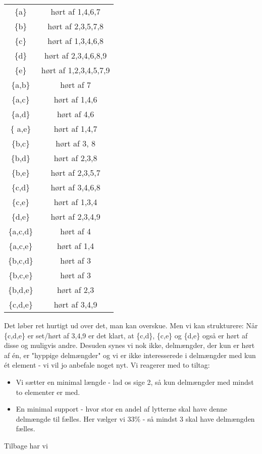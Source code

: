 \documentclass[a4paper, 12pt]{article}
\theoremstyle{remark}
\begin{document}
\begin{center}
\begin{tabular}{cc}


\{a\} & hørt af 1,4,6,7 \\
\{b\} & hørt af 2,3,5,7,8 \\
\{c\}& hørt af 1,3,4,6,8\\
\{d\} & hørt af 2,3,4,6,8,9 \\
\{e\} & hørt af 1,2,3,4,5,7,9 \\
\{a,b\} & hørt af 7 \\
\{a,c\} & hørt af 1,4,6 \\
\{a,d\}& hørt af 4,6\\
\{ a,e\}& hørt af 1,4,7\\
\{b,c\} & hørt af 3, 8 \\
\{b,d\}& hørt af 2,3,8 \\
\{b,e\}& hørt af  2,3,5,7\\
\{c,d\}& hørt af 3,4,6,8\\
\{c,e\}& hørt af 1,3,4\\
\{d,e\}& hørt af 2,3,4,9\\
\{a,c,d\}& hørt af 4\\
\{a,c,e\}& hørt af 1,4 \\
\{b,c,d\}& hørt af 3\\
\{b,c,e\}& hørt af 3\\
\{b,d,e\}& hørt af 2,3 \\
\{c,d,e\} & hørt af 3,4,9 \\

\end{tabular}
\end{center}
Det løber ret hurtigt ud over det, man kan overskue. Men vi kan strukturere: Når \{c,d,e\} er set/hørt af  3,4,9 er det klart, at \{c,d\}, \{c,e\} og \{d,e\} også er hørt af  disse og muligvis andre. Desuden synes vi nok ikke, delmængder, der kun er hørt af én, er "hyppige delmængder" og vi er ikke interesserede i delmængder med kun ét element - vi vil jo anbefale noget nyt. Vi reagerer med to tiltag:
\begin{itemize}
\item  Vi sætter en minimal længde - lad os sige 2, så kun delmængder med mindst to elementer er med.  
\item En minimal support - hvor stor en andel af lytterne skal have denne delmængde til fælles. Her vælger vi 33\% - så mindst 3 skal have delmængden fælles.
\end{itemize}
Tilbage har vi 
\end{document}
